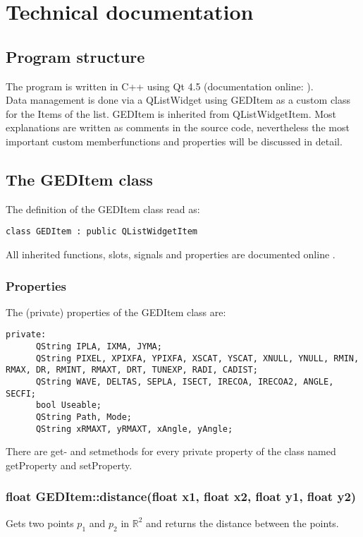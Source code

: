 \section{Technical documentation}\label{tech}
\subsection{Program structure}
The program is written in C++ using Qt 4.5 (documentation online: \cite{qtdoc}).\\
 Data management is done via a QListWidget using GEDItem as a custom class for the Items of the list. GEDItem is inherited from QListWidgetItem. Most explanations are written as comments in the source code, nevertheless the most important custom memberfunctions and properties will be discussed in detail. \\
 
 
\subsection{The GEDItem class}
The definition of the GEDItem class read as: 
\begin{lstlisting}
class GEDItem : public QListWidgetItem
\end{lstlisting}
All inherited functions, slots, signals and properties are documented online \cite{qtdoc}.     \\
\subsubsection{Properties} 
 The (private) properties of the GEDItem class are: 
\begin{lstlisting}
private: 
      QString IPLA, IXMA, JYMA;
      QString PIXEL, XPIXFA, YPIXFA, XSCAT, YSCAT, XNULL, YNULL, RMIN, RMAX, DR, RMINT, RMAXT, DRT, TUNEXP, RADI, CADIST;
      QString WAVE, DELTAS, SEPLA, ISECT, IRECOA, IRECOA2, ANGLE, SECFI;
      bool Useable;
      QString Path, Mode;
      QString xRMAXT, yRMAXT, xAngle, yAngle;
\end{lstlisting}
There are get- and setmethods for every private property of the class named getProperty and setProperty. 
\subsubsection{float GEDItem::distance(float x1, float x2, float y1, float y2)} 
Gets two points $p_1$ and $p_2$ in $\mathbb{R}^2$ and returns the distance between the points. 

